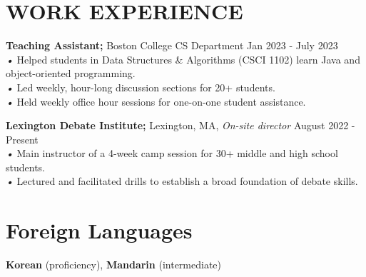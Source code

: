 \documentclass[11pt]{article}
\begin{document}
\section*{WORK EXPERIENCE}
\textbf{Teaching Assistant;} Boston College CS Department \hfill Jan 2023 - July 2023 \\
\textit{•} Helped students in Data Structures \& Algorithms (CSCI 1102) learn Java and object-oriented programming. \\
\textit{•} Led weekly, hour-long discussion sections for 20+ students. \\
\textit{•} Held weekly office hour sessions for one-on-one student assistance.

\textbf{Lexington Debate Institute;} Lexington, MA, \textit {On-site director} \hfill August 2022 - Present \\
\textit{•} Main instructor of a 4-week camp session for 30+ middle and high school students. \\
\textit{•} Lectured and facilitated drills to establish a broad foundation of debate skills.

\section*{Foreign Languages}
\textbf{Korean} (proficiency), \textbf{Mandarin} (intermediate)
\end{document}
